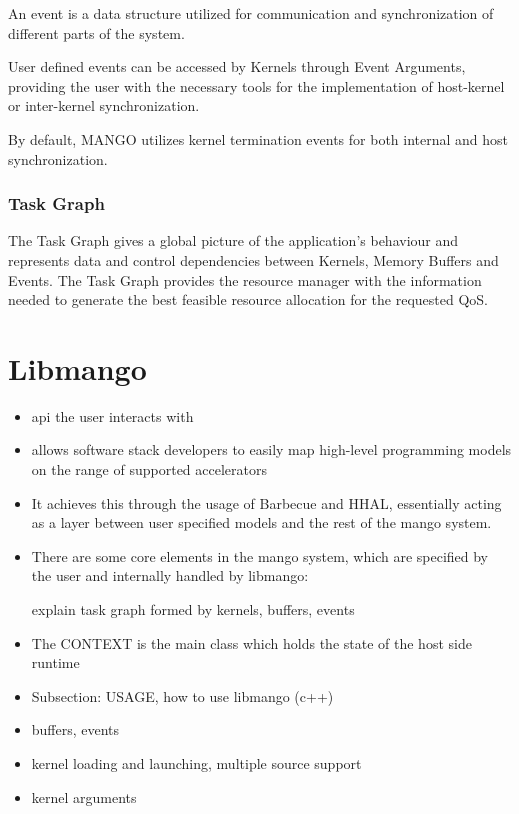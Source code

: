 An event is a data structure utilized for communication and synchronization of different parts of the system.

User defined events can be accessed by Kernels through Event Arguments, providing the user with the necessary tools for the implementation of host-kernel or inter-kernel synchronization.

By default, MANGO utilizes kernel termination events for both internal and host synchronization.

\subsubsection{Task Graph}

The Task Graph gives a global picture of the application's behaviour and represents data and control dependencies between Kernels, Memory Buffers and Events. The Task Graph provides the resource manager with the information needed to generate the best feasible resource allocation for the requested QoS. \cite{mango_exploring_manycore_architectures}


\section{Libmango}
\begin{itemize}
    \item 
    api the user interacts with
    \item
    allows software stack developers to easily map high-level programming models on the range of supported accelerators
    \item 
    It achieves this through the usage of Barbecue and HHAL, essentially acting as a layer between user specified models and the rest of the mango system.
    \item
    There are some core elements in the mango system, which are specified by the user and internally handled by libmango:

    explain task graph formed by kernels, buffers, events
    \item 
    The CONTEXT is the main class which holds the state of the host side runtime
    \item
    Subsection: USAGE, how to use libmango (c++)
    \item 
    buffers, events
    \item 
    kernel loading and launching, multiple source support
    \item 
    kernel arguments
\end{itemize}

